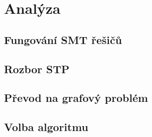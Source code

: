 \chapter{Analýza}

\section{Fungování SMT řešičů}

\section{Rozbor STP}

\section{Převod na grafový problém}

\section{Volba algoritmu}


